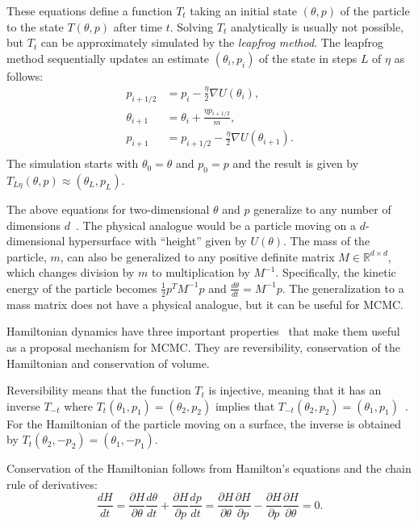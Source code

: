 \documentclass[english,twoside,openright]{HYgraduMLDS}
\newcommand{\R}{\mathbb{R}}
\begin{document}
These equations define a function \(T_t\) taking an initial state 
\((\theta, p)\) of the particle to the state \(T(\theta, p)\) after time \(t\).
Solving \(T_t\) analytically is usually not possible, but \(T_t\) can be 
approximately simulated by the \emph{leapfrog method}. The leapfrog method sequentially
updates an estimate \((\theta_i, p_i)\) of the state in steps \(L\) of \(\eta\) 
as follows:
\begin{align*}
    p_{i+1/2} &= p_i - \frac{\eta}{2}\nabla U(\theta_i), \\
    \theta_{i+1} &= \theta_i + \frac{\eta p_{i+1/2}}{m}, \\
    p_{i+1} &= p_{i+1/2} - \frac{\eta}{2}\nabla U(\theta_{i+1}). \\
\end{align*}
The simulation starts with \(\theta_0 = \theta\) and \(p_0 = p\) and the 
result is given by \(T_{L\eta}(\theta, p) \approx (\theta_L, p_L)\).

The above equations for two-dimensional \(\theta\) and \(p\) generalize to
any number of dimensions \(d\)~\cite{neal2012mcmc}. The physical analogue would be a particle moving
on a \(d\)-dimensional hypersurface with ``height'' given by \(U(\theta)\).
The mass of the particle, \(m\), can also be generalized to any positive
definite matrix \(M \in \R^{d\times d}\), which changes division by
\(m\) to multiplication by \(M^{-1}\). Specifically, the kinetic energy of the
particle becomes \(\frac{1}{2}p^{T}M^{-1}p\) and
\(\frac{d\theta}{dt} = M^{-1}p\). The generalization to a mass matrix does not
have a physical analogue, but it can be useful for MCMC.

Hamiltonian dynamics have three important properties~\cite{neal2012mcmc} 
that make them useful as a
proposal mechanism for MCMC. They are reversibility, 
conservation of the Hamiltonian and conservation of volume.

Reversibility means that the function \(T_t\) is injective, meaning that
it has an inverse \(T_{-t}\) where \(T_t(\theta_1, p_1) = (\theta_2, p_2)\)
implies that \(T_{-t}(\theta_2, p_2) = (\theta_1, p_1)\)~\cite{neal2012mcmc}.
For the Hamiltonian of the particle moving on a surface, the inverse 
is obtained by \(T_t(\theta_2, -p_2) = (\theta_1, -p_1)\).

Conservation of the Hamiltonian follows from Hamilton's equations and the 
chain rule of derivatives:
\[
    \frac{dH}{dt} = \frac{\partial H}{\partial \theta}\frac{d \theta}{dt}
    + \frac{\partial H}{\partial p}\frac{dp}{dt}
    = \frac{\partial H}{\partial \theta}\frac{\partial H}{\partial p}
    - \frac{\partial H}{\partial p}\frac{\partial H}{\partial \theta}
    = 0.
\]
\end{document}
